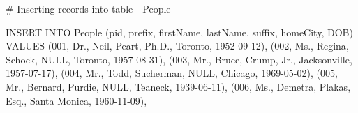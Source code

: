 \documentclass[
  letterpaper,
  DIV=11,
  numbers=noendperiod]{scrreprt}
\newenvironment{Shaded}{\begin{snugshade}}{\end{snugshade}}
\newcommand{\CommentTok}[1]{\textcolor[rgb]{0.37,0.37,0.37}{#1}}
\newcommand{\ConstantTok}[1]{\textcolor[rgb]{0.56,0.35,0.01}{#1}}
\newcommand{\DecValTok}[1]{\textcolor[rgb]{0.68,0.00,0.00}{#1}}
\newcommand{\FunctionTok}[1]{\textcolor[rgb]{0.28,0.35,0.67}{#1}}
\newcommand{\NormalTok}[1]{\textcolor[rgb]{0.00,0.23,0.31}{#1}}
\newcommand{\StringTok}[1]{\textcolor[rgb]{0.13,0.47,0.30}{#1}}
\begin{document}
\begin{Shaded}
\begin{Highlighting}[]
\CommentTok{\# Inserting records into table {-} People }

\NormalTok{INSERT INTO }\FunctionTok{People}\NormalTok{ (pid, prefix, firstName, lastName, suffix, homeCity, DOB)}
\NormalTok{VALUES}
\NormalTok{ (}\DecValTok{001}\NormalTok{, }\StringTok{\textquotesingle{}Dr.\textquotesingle{}}\NormalTok{, }\StringTok{\textquotesingle{}Neil\textquotesingle{}}\NormalTok{, }\StringTok{\textquotesingle{}Peart\textquotesingle{}}\NormalTok{, }\StringTok{\textquotesingle{}Ph.D.\textquotesingle{}}\NormalTok{, }\StringTok{\textquotesingle{}Toronto\textquotesingle{}}\NormalTok{, }\StringTok{\textquotesingle{}1952{-}09{-}12\textquotesingle{}}\NormalTok{),}
\NormalTok{ (}\DecValTok{002}\NormalTok{, }\StringTok{\textquotesingle{}Ms.\textquotesingle{}}\NormalTok{, }\StringTok{\textquotesingle{}Regina\textquotesingle{}}\NormalTok{, }\StringTok{\textquotesingle{}Schock\textquotesingle{}}\NormalTok{, }\ConstantTok{NULL}\NormalTok{, }\StringTok{\textquotesingle{}Toronto\textquotesingle{}}\NormalTok{, }\StringTok{\textquotesingle{}1957{-}08{-}31\textquotesingle{}}\NormalTok{),}
\NormalTok{ (}\DecValTok{003}\NormalTok{, }\StringTok{\textquotesingle{}Mr.\textquotesingle{}}\NormalTok{, }\StringTok{\textquotesingle{}Bruce\textquotesingle{}}\NormalTok{, }\StringTok{\textquotesingle{}Crump\textquotesingle{}}\NormalTok{, }\StringTok{\textquotesingle{}Jr.\textquotesingle{}}\NormalTok{, }\StringTok{\textquotesingle{}Jacksonville\textquotesingle{}}\NormalTok{, }\StringTok{\textquotesingle{}1957{-}07{-}17\textquotesingle{}}\NormalTok{),}
\NormalTok{ (}\DecValTok{004}\NormalTok{, }\StringTok{\textquotesingle{}Mr.\textquotesingle{}}\NormalTok{, }\StringTok{\textquotesingle{}Todd\textquotesingle{}}\NormalTok{, }\StringTok{\textquotesingle{}Sucherman\textquotesingle{}}\NormalTok{, }\ConstantTok{NULL}\NormalTok{, }\StringTok{\textquotesingle{}Chicago\textquotesingle{}}\NormalTok{, }\StringTok{\textquotesingle{}1969{-}05{-}02\textquotesingle{}}\NormalTok{),}
\NormalTok{ (}\DecValTok{005}\NormalTok{, }\StringTok{\textquotesingle{}Mr.\textquotesingle{}}\NormalTok{, }\StringTok{\textquotesingle{}Bernard\textquotesingle{}}\NormalTok{, }\StringTok{\textquotesingle{}Purdie\textquotesingle{}}\NormalTok{, }\ConstantTok{NULL}\NormalTok{, }\StringTok{\textquotesingle{}Teaneck\textquotesingle{}}\NormalTok{, }\StringTok{\textquotesingle{}1939{-}06{-}11\textquotesingle{}}\NormalTok{),}
\NormalTok{ (}\DecValTok{006}\NormalTok{, }\StringTok{\textquotesingle{}Ms.\textquotesingle{}}\NormalTok{, }\StringTok{\textquotesingle{}Demetra\textquotesingle{}}\NormalTok{, }\StringTok{\textquotesingle{}Plakas\textquotesingle{}}\NormalTok{, }\StringTok{\textquotesingle{}Esq.\textquotesingle{}}\NormalTok{, }\StringTok{\textquotesingle{}Santa Monica\textquotesingle{}}\NormalTok{, }\StringTok{\textquotesingle{}1960{-}11{-}09\textquotesingle{}}\NormalTok{),}

\end{Highlighting}
\end{Shaded}
\end{document}
